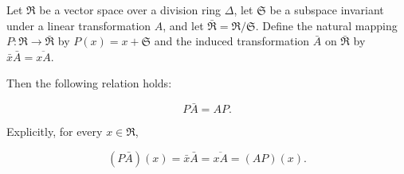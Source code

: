 Let $\Re$ be a vector space over a division ring $\Delta$, let $\mathfrak{S}$ be a subspace invariant under a linear transformation $A$, and let $\bar{\Re} = \Re / \mathfrak{S}$. Define the natural mapping $P: \Re \to \bar{\Re}$ by $P(x) = x + \mathfrak{S}$ and the induced transformation $\bar{A}$ on $\bar{\Re}$ by $\bar{x}\bar{A} = \overline{xA}$.

Then the following relation holds:

$$P \bar{A} = A P.$$

Explicitly, for every $x \in \Re$,

$$(P\bar{A})(x) = \bar{x}\bar{A} = \overline{xA} = (AP)(x).$$
